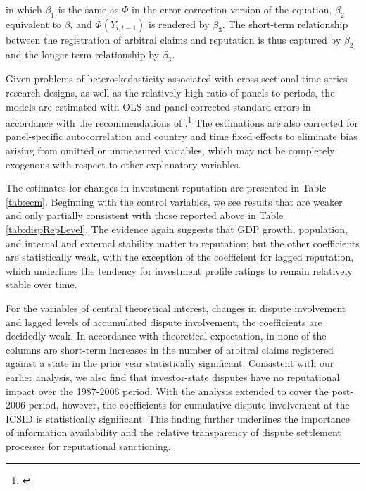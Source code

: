 \documentclass[12pt,onesided]{amsart}
\begin{document}
in which $\beta_{1}$ is the same as $\Phi$ in the error correction version of the equation, $\beta_{2}$ equivalent to $\beta$, and $\Phi(Y_{i,t-1})$ is rendered by $\beta_{3}$. The short-term relationship between the registration of arbitral claims and reputation is thus captured by $\beta_{2}$  and the longer-term relationship by $\beta_{3}$.

Given problems of heteroskedasticity associated with cross-sectional time series research designs, as well as the relatively high ratio of panels to periods, the models are estimated with OLS and panel-corrected standard errors in accordance with the recommendations of \citeauthor{beck:katz:1995}.\footnote{\citet{beck:katz:1995}} The estimations are also corrected for panel-specific autocorrelation and country and time fixed effects to eliminate bias arising from omitted or unmeasured variables, which may not be completely exogenous with respect to other explanatory variables.

The estimates for changes in investment reputation are presented in Table \ref{tab:ecm}. Beginning with the control variables, we see results that are weaker and only partially consistent with those reported above in Table \ref{tab:dispRepLevel}. The evidence again suggests that GDP growth, population, and internal and external stability matter to reputation; but the other coefficients are statistically weak, with the exception of the coefficient for lagged reputation, which underlines the tendency for investment profile ratings to remain relatively stable over time. 

For the variables of central theoretical interest, changes in dispute involvement and lagged levels of accumulated dispute involvement, the coefficients are decidedly weak. In accordance with theoretical expectation, in none of the columns are short-term increases in the number of arbitral claims registered against a state in the prior year statistically significant. Consistent with our earlier analysis, we also find that investor-state disputes have no reputational impact over the 1987-2006 period. With the analysis extended to cover the post-2006 period, however, the coefficients for cumulative dispute involvement at the ICSID is statistically significant. This finding further underlines the importance of information availability and the relative transparency of dispute settlement processes for reputational sanctioning. 
\end{document}
